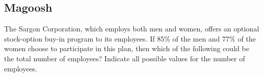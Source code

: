 \documentclass[answers, 11pt]{exam}
\begin{document}
\begin{questions}

\section{Magoosh}
\question[1]
The Sargon Corporation, which employs both men and women, offers an optional stock-option buy-in program to its employees. If 85\% of the men and 77\% of the women choose to participate in this plan, then which of the following could be the total number of employees? Indicate all possible values for the number of employees.
\begin{choices}
\end{choices}


\end{questions}
\end{document}
